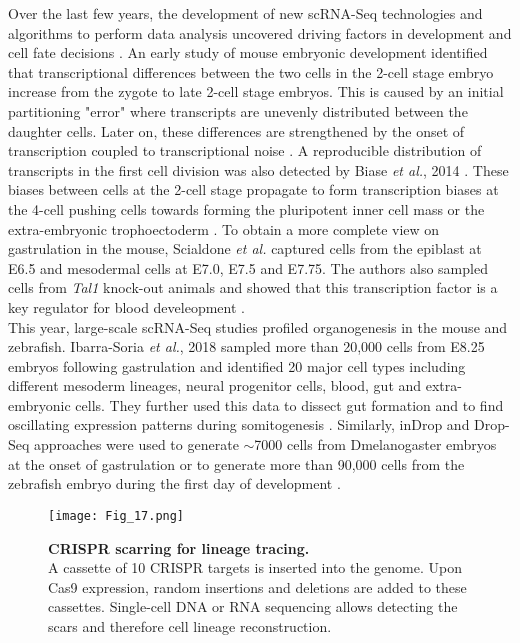 Over the last few years, the development of new scRNA-Seq technologies and algorithms to perform data analysis uncovered driving factors in development and cell fate decisions \citep{Griffiths2018}. An early study of mouse embryonic development identified that transcriptional differences between the two cells in the 2-cell stage embryo increase from the zygote to late 2-cell stage embryos. This is caused by an initial partitioning "error" where transcripts are unevenly distributed between the daughter cells. Later on, these differences are strengthened by the onset of transcription coupled to transcriptional noise \citep{Piras2014, Shi2015a}. A reproducible distribution of transcripts in the first cell division was also detected by Biase \emph{et al.}, 2014 \cite{Biase2014}. These biases between cells at the 2-cell stage propagate to form transcription biases at the 4-cell pushing cells towards forming the pluripotent inner cell mass or the extra-embryonic trophoectoderm \citep{Goolam2016, Shi2015a}. To obtain a more complete view on gastrulation in the mouse, Scialdone \emph{et al.} captured cells from the epiblast at E6.5 and mesodermal cells at E7.0, E7.5 and E7.75. The authors also sampled cells from \emph{Tal1} knock-out animals and showed that this transcription factor is a key regulator for blood develeopment \citep{Scialdone2016}. \\

This year, large-scale scRNA-Seq studies profiled organogenesis in the mouse and zebrafish. Ibarra-Soria \emph{et al.}, 2018 sampled more than 20,000 cells from E8.25 embryos following gastrulation and identified 20 major cell types including different mesoderm lineages, neural progenitor cells, blood, gut and extra-embryonic cells. They further used this data to dissect gut formation and to find oscillating expression patterns during somitogenesis \citep{Ibarra-Soria2018}. Similarly, inDrop and Drop-Seq approaches were used to generate $\sim$7000 cells from \gls{Dmelanogaster} embryos at the onset of gastrulation \citep{Karaiskos2017} or to generate more than 90,000 cells from the zebrafish embryo during the first day of development \citep{Wagner2018}.

\begin{figure}[!h]
\centering
\texttt{[image: Fig\_17.png]}
\caption[CRISPR scarring for lineage tracing]{\textbf{CRISPR scarring for lineage tracing.}\\
A cassette of 10 CRISPR targets is inserted into the genome. Upon Cas9 expression, random insertions and deletions are added to these cassettes. Single-cell DNA or RNA sequencing allows detecting the scars and therefore cell lineage reconstruction.}
\label{fig0:CRISPR}
\end{figure}

